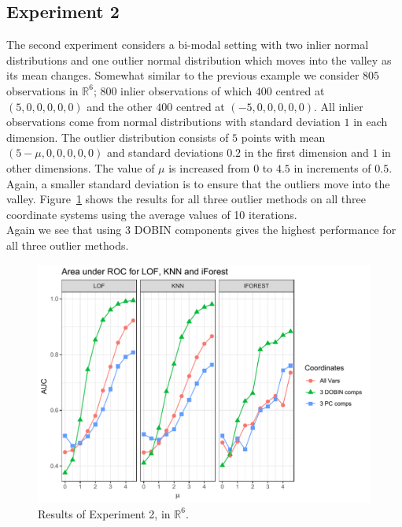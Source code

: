 \documentclass[a4paper,11pt]{article}
\begin{document}
\subsection{Experiment 2}
The second experiment considers a bi-modal setting with two inlier normal distributions and one outlier normal  distribution which moves into the valley as its mean changes. Somewhat similar to the previous example we consider $805$ observations in $\mathbb{R}^6$; $800$ inlier observations of which $400$  centred at $(5,0,0,0,0,0)$ and the other $400$ centred at $(-5,0,0,0,0,0)$. All inlier observations come from normal distributions with standard deviation $1$ in each dimension. The outlier distribution consists of $5$ points with mean $(5-\mu,0,0,0,0,0)$ and standard deviations $0.2$ in the first dimension and $1$ in other dimensions. The value of $\mu$ is increased from $0$ to $4.5$ in increments of $0.5$.  Again, a smaller standard deviation is to ensure that the outliers move into the valley. Figure~\ref{fig:Exp2} shows the results for all three  outlier methods on all three coordinate systems using the average values of 10 iterations. \\

Again we see that using 3 DOBIN components gives the highest performance for all three outlier methods. %

\begin{figure}[!ht]
	\centering
	\includegraphics[scale=0.5]{Exp2.pdf}
	\caption{Results of Experiment 2, in $\mathbb{R}^6$.}
	\label{fig:Exp2}
\end{figure} 
\end{document}

